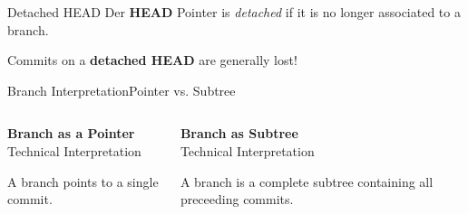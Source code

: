 \documentclass{setbeamer}
\begin{document}
\begin{frame}[c]{Detached HEAD}
    Der \textbf{HEAD} Pointer is \emph{detached} if it is no longer associated to a branch.

    \begin{TUMBoxFill}[orange]{}{}
        Commits on a \textbf{detached HEAD} are generally lost!
    \end{TUMBoxFill}
\end{frame}

\begin{frame}[c]{Branch Interpretation}{Pointer vs. Subtree}
    \begin{columns}[T]
        \begin{column}{0.5\textwidth}
            \textbf{Branch as a Pointer}\\Technical Interpretation

            \vspace{3mm}
            A branch points to a single commit.
        \end{column}

        \begin{column}{0.5\textwidth}
            \textbf{Branch as Subtree}\\Technical Interpretation

            \vspace{3mm}
            A branch is a complete subtree containing all preceeding commits.
        \end{column}
    \end{columns}
\end{frame}
\end{document}
